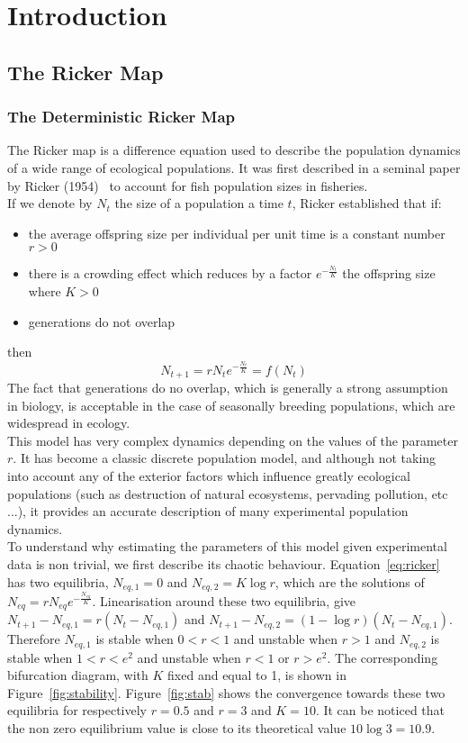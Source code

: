 \documentclass{article}
\begin{document}
	\section{Introduction}
	\subsection{The Ricker Map}
	\subsubsection{The Deterministic Ricker Map}
	The Ricker map is a difference equation used to describe the population dynamics of a wide range of ecological populations. It was first described in a seminal paper by Ricker (1954)~\cite{Ricker1954} to account for fish population sizes in fisheries. \\
	If we denote by $N_t$ the size of a population a time $t$, Ricker established that if:
	\begin{itemize}
		\item the average offspring size per individual per unit time is a constant number $r > 0$
		\item there is a crowding effect which reduces by a factor $e^{-\frac{N_t}{K}}$ the offspring size where $K > 0$
		\item generations do not overlap
	\end{itemize}
	then 
	\begin{equation}
		N_{t+1} = r N_t e^{-\frac{N_t}{K}} = f(N_t)
		\label{eq:ricker}
	\end{equation}
	The fact that generations do no overlap, which is generally a strong assumption in biology, is acceptable in the case of seasonally breeding populations, which are widespread in ecology. \\
	This model has very complex dynamics depending on the values of the parameter $r$. It has become a classic discrete population model, and although not taking into account any of the exterior factors which influence greatly ecological populations (such as destruction of natural ecosystems, pervading pollution, etc ...), it provides an accurate description of many experimental population dynamics. \\
	To understand why estimating the parameters of this model given experimental data is non trivial, we first describe its chaotic behaviour. Equation~\ref{eq:ricker} has two equilibria, $N_{eq, 1} = 0$ and $N_{eq, 2} = K\log r$, which are the solutions of  $N_{eq} = r N_{eq} e^{-\frac{N_{eq}}{K}}$. Linearisation around these two equilibria, give $N_{t+1} - N_{eq, 1} = r(N_{t} - N_{eq, 1})$ and $N_{t+1} - N_{eq, 2} = (1-\log r)(N_{t} - N_{eq, 1})$. Therefore $N_{eq, 1}$ is stable when $0 < r < 1$ and unstable when $r > 1$ and $N_{eq, 2}$ is stable when $1 < r < e^2$ and unstable when $r < 1$ or $r > e^2$. The corresponding bifurcation diagram, with $K$ fixed and equal to 1, is shown in Figure~\ref{fig:stability}. Figure~\ref{fig:stab} shows the convergence towards these two equilibria for respectively $r=0.5$ and $r=3$ and $K=10$. It can be noticed that the non zero equilibrium value is close to its theoretical value $10 \log 3 = 10.9$. \\
\end{document}
